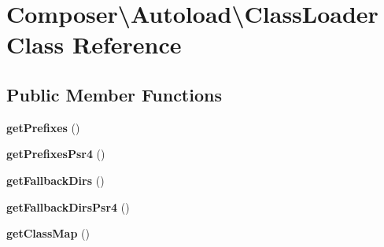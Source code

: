\hypertarget{classComposer_1_1Autoload_1_1ClassLoader}{\section{Composer\textbackslash{}Autoload\textbackslash{}Class\+Loader Class Reference}
\label{classComposer_1_1Autoload_1_1ClassLoader}
}
\subsection*{Public Member Functions}
\begin{DoxyCompactItemize}
\item 
\hypertarget{classComposer_1_1Autoload_1_1ClassLoader_af3d914a2e97ec1118f3d70e5a0ce6435}{{\bfseries get\+Prefixes} ()}\label{classComposer_1_1Autoload_1_1ClassLoader_af3d914a2e97ec1118f3d70e5a0ce6435}

\item 
\hypertarget{classComposer_1_1Autoload_1_1ClassLoader_a36833139effe6653454d8f02ea8f555b}{{\bfseries get\+Prefixes\+Psr4} ()}\label{classComposer_1_1Autoload_1_1ClassLoader_a36833139effe6653454d8f02ea8f555b}

\item 
\hypertarget{classComposer_1_1Autoload_1_1ClassLoader_a9fe425ce19f8e1298cefbf5094b3c402}{{\bfseries get\+Fallback\+Dirs} ()}\label{classComposer_1_1Autoload_1_1ClassLoader_a9fe425ce19f8e1298cefbf5094b3c402}

\item 
\hypertarget{classComposer_1_1Autoload_1_1ClassLoader_a149bf4470ee7c50bd6b9a84b6aa4bccd}{{\bfseries get\+Fallback\+Dirs\+Psr4} ()}\label{classComposer_1_1Autoload_1_1ClassLoader_a149bf4470ee7c50bd6b9a84b6aa4bccd}

\item 
\hypertarget{classComposer_1_1Autoload_1_1ClassLoader_aa7d3012e1f8299ecc6c3ff3cb3f2652e}{{\bfseries get\+Class\+Map} ()}\label{classComposer_1_1Autoload_1_1ClassLoader_aa7d3012e1f8299ecc6c3ff3cb3f2652e}


\end{DoxyCompactItemize}

